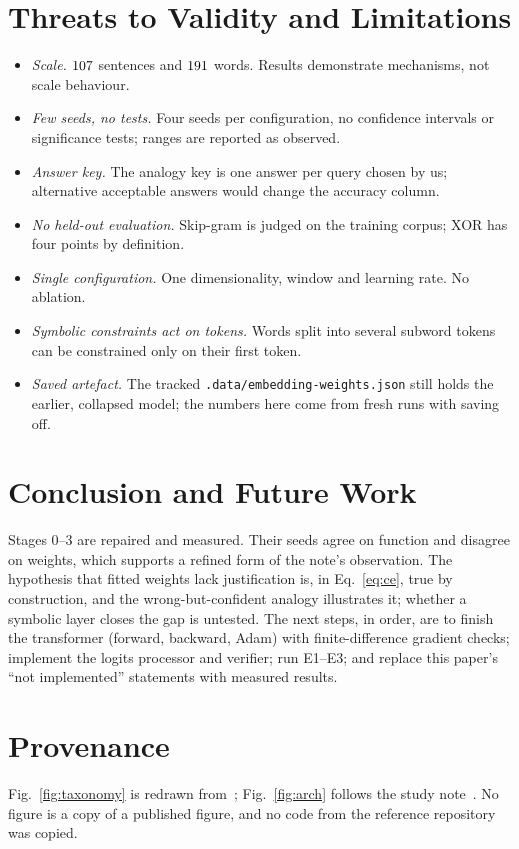 \documentclass[conference]{IEEEtran}
\begin{document}
\section{Threats to Validity and Limitations}\label{sec:threats}
\begin{itemize}
\item \emph{Scale.} $107$ sentences and $191$ words. Results demonstrate mechanisms, not scale behaviour.
\item \emph{Few seeds, no tests.} Four seeds per configuration, no confidence intervals or significance tests; ranges are reported as observed.
\item \emph{Answer key.} The analogy key is one answer per query chosen by us; alternative acceptable answers would change the accuracy column.
\item \emph{No held-out evaluation.} Skip-gram is judged on the training corpus; XOR has four points by definition.
\item \emph{Single configuration.} One dimensionality, window and learning rate. No ablation.
\item \emph{Symbolic constraints act on tokens.} Words split into several subword tokens can be constrained only on their first token.
\item \emph{Saved artefact.} The tracked \texttt{.data/embedding-weights.json} still holds the earlier, collapsed model; the numbers here come from fresh runs with saving off.
\end{itemize}

\section{Conclusion and Future Work}
Stages 0--3 are repaired and measured. Their seeds agree on function and disagree on weights, which supports a refined form of the note's observation. The hypothesis that fitted weights lack justification is, in Eq.~\eqref{eq:ce}, true by construction, and the wrong-but-confident analogy illustrates it; whether a symbolic layer closes the gap is untested. The next steps, in order, are to finish the transformer (forward, backward, Adam) with finite-difference gradient checks; implement the logits processor and verifier; run E1--E3; and replace this paper's ``not implemented'' statements with measured results.

\section*{Provenance}
Fig.~\ref{fig:taxonomy} is redrawn from~\cite{sheth2023}; Fig.~\ref{fig:arch} follows the study note~\cite{note}. No figure is a copy of a published figure, and no code from the reference repository~\cite{howllms} was copied.
\end{document}

